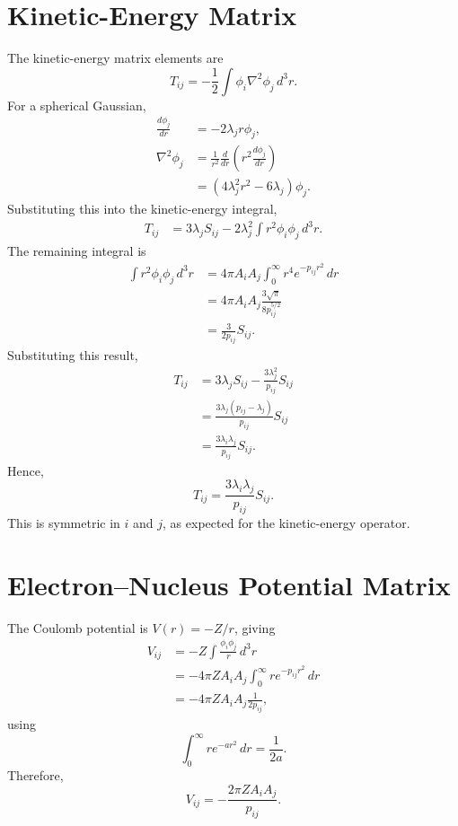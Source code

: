 \section{Kinetic-Energy Matrix}

The kinetic-energy matrix elements are
\[
T_{ij}
=-\frac12\int\phi_i\nabla^2\phi_j\,d^3r.
\]
For a spherical Gaussian,
\begin{align*}
\frac{d\phi_j}{dr}
&=-2\lambda_jr\phi_j,\\
\nabla^2\phi_j
&=\frac1{r^2}\frac{d}{dr}
  \left(r^2\frac{d\phi_j}{dr}\right)\\
&=(4\lambda_j^2r^2-6\lambda_j)\phi_j.
\end{align*}
Substituting this into the kinetic-energy integral,
\begin{align*}
T_{ij}
&=3\lambda_jS_{ij}
 -2\lambda_j^2
  \int r^2\phi_i\phi_j\,d^3r.
\end{align*}
The remaining integral is
\begin{align*}
\int r^2\phi_i\phi_j\,d^3r
&=4\pi A_iA_j
  \int_0^\infty r^4e^{-p_{ij}r^2}\,dr\\
&=4\pi A_iA_j
  \frac{3\sqrt{\pi}}{8p_{ij}^{5/2}}\\
&=\frac{3}{2p_{ij}}S_{ij}.
\end{align*}
Substituting this result,
\begin{align*}
T_{ij}
&=3\lambda_jS_{ij}
  -\frac{3\lambda_j^2}{p_{ij}}S_{ij}\\
&=\frac{3\lambda_j(p_{ij}-\lambda_j)}
        {p_{ij}}S_{ij}\\
&=\frac{3\lambda_i\lambda_j}{p_{ij}}S_{ij}.
\end{align*}
Hence,
\begin{equation}
\boxed{
T_{ij}
=\frac{3\lambda_i\lambda_j}{p_{ij}}S_{ij}.
}
\label{eq:appendix-kinetic}
\end{equation}
This is symmetric in $i$ and $j$, as expected for
the kinetic-energy operator.

\section{Electron--Nucleus Potential Matrix}

The Coulomb potential is $V(r)=-Z/r$, giving
\begin{align*}
V_{ij}
&=-Z\int\frac{\phi_i\phi_j}{r}\,d^3r\\
&=-4\pi ZA_iA_j
  \int_0^\infty re^{-p_{ij}r^2}\,dr\\
&=-4\pi ZA_iA_j\frac{1}{2p_{ij}},
\end{align*}
using
\[
\int_0^\infty re^{-ar^2}\,dr=\frac1{2a}.
\]
Therefore,
\begin{equation}
\boxed{
V_{ij}=-\frac{2\pi ZA_iA_j}{p_{ij}}.
}
\label{eq:appendix-potential}
\end{equation}


